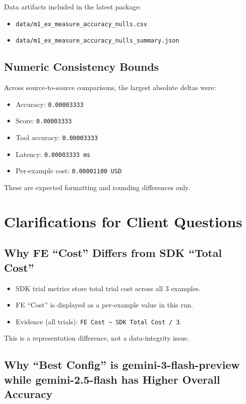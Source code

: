 \documentclass[11pt]{article}
\begin{document}
Data artifacts included in the latest package:
\begin{itemize}
    \item \texttt{data/m1\_ex\_measure\_accuracy\_nulls.csv}
    \item \texttt{data/m1\_ex\_measure\_accuracy\_nulls\_summary.json}
\end{itemize}

\subsection{Numeric Consistency Bounds}

Across source-to-source comparisons, the largest absolute deltas were:
\begin{itemize}
    \item Accuracy: \texttt{0.00003333}
    \item Score: \texttt{0.00003333}
    \item Tool accuracy: \texttt{0.00003333}
    \item Latency: \texttt{0.00003333 ms}
    \item Per-example cost: \texttt{0.00001100 USD}
\end{itemize}

These are expected formatting and rounding differences only.

\section{Clarifications for Client Questions}

\subsection{Why FE ``Cost'' Differs from SDK ``Total Cost''}

\begin{itemize}
    \item SDK trial metrics store total trial cost across all 3 examples.
    \item FE ``Cost'' is displayed as a per-example value in this run.
    \item Evidence (all trials): \texttt{FE Cost \textasciitilde{} SDK Total Cost / 3}.
\end{itemize}

This is a representation difference, not a data-integrity issue.

\subsection{Why ``Best Config'' is gemini-3-flash-preview while gemini-2.5-flash has Higher Overall Accuracy}
\end{document}
